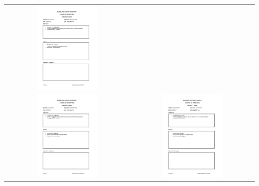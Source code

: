 \documentclass[12pt,a4paper]{article}
\begin{document}
\begin{appendices}
\begin{longtable}{@{}cc@{}}
\includegraphics[page=4, width=0.5\textwidth]{figures/diaries} \\
\includegraphics[page=5, width=0.5\textwidth]{figures/diaries} &
\includegraphics[page=6, width=0.5\textwidth]{figures/diaries} \\

\end{longtable}
\end{appendices}
\end{document}
